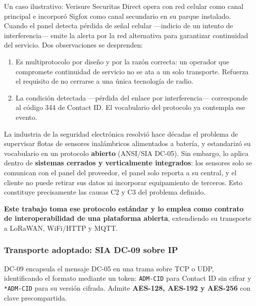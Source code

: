 

Un caso ilustrativo: Verisure Securitas Direct opera con red celular como canal principal e incorporó
Sigfox como canal secundario en su parque instalado. Cuando el panel detecta pérdida de señal celular
---indicio de un intento de interferencia--- emite la alerta por la red alternativa para garantizar
continuidad del servicio. Dos observaciones se desprenden:

\begin{enumerate}
\item Es multiprotocolo por diseño y por la razón correcta: un operador que compromete continuidad de
servicio no se ata a un solo transporte. Refuerza el requisito de no cerrarse a una única tecnología de
radio.
\item La condición detectada ---pérdida del enlace por interferencia--- corresponde al código 344 de
Contact ID. El vocabulario del protocolo ya contempla ese evento.
\end{enumerate}

\begin{cajaclave}[title={El planteamiento del trabajo, en una formulación}]
La industria de la seguridad electrónica resolvió hace décadas el problema de supervisar flotas de
sensores inalámbricos alimentados a batería, y estandarizó su vocabulario en un protocolo
\textbf{abierto} (ANSI/SIA DC-05). Sin embargo, lo aplica dentro de \textbf{sistemas cerrados y
verticalmente integrados}: los sensores solo se comunican con el panel del proveedor, el panel solo
reporta a su central, y el cliente no puede retirar sus datos ni incorporar equipamiento de terceros.
Esto constituye precisamente las causas C2 y C3 del problema definido.

\textbf{Este trabajo toma ese protocolo estándar y lo emplea como contrato de interoperabilidad de una
plataforma abierta}, extendiendo su transporte a LoRaWAN, WiFi/HTTP y MQTT.
\end{cajaclave}

\subsubsection{Transporte adoptado: SIA DC-09 sobre IP}

DC-09 encapsula el mensaje DC-05 en una trama sobre TCP o UDP, identificando el formato mediante un
token: \texttt{ADM-CID} para Contact ID sin cifrar y \texttt{*ADM-CID} para su versión cifrada. Admite
\textbf{AES-128, AES-192 y AES-256} con clave precompartida.

